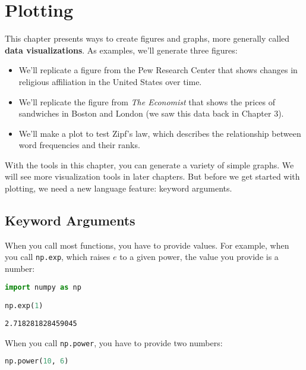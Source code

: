 \hypertarget{plotting}{%
\chapter{Plotting}\label{plotting}}

This chapter presents ways to create figures and graphs, more generally
called \textbf{data visualizations}. As examples, we'll generate three
figures:

\begin{itemize}
\item
  We'll replicate a figure from the Pew Research Center that shows
  changes in religious affiliation in the United States over time.
\item
  We'll replicate the figure from \emph{The Economist} that shows the
  prices of sandwiches in Boston and London (we saw this data back in
  Chapter 3).
\item
  We'll make a plot to test Zipf's law, which describes the relationship
  between word frequencies and their ranks.
\end{itemize}

With the tools in this chapter, you can generate a variety of simple
graphs. We will see more visualization tools in later chapters. But
before we get started with plotting, we need a new language feature:
keyword arguments.

\hypertarget{keyword-arguments}{%
\section{Keyword Arguments}\label{keyword-arguments}}

When you call most functions, you have to provide values. For example,
when you call \passthrough{\lstinline!np.exp!}, which raises \(e\) to a
given power, the value you provide is a number:

\begin{lstlisting}[language=Python,style=source]
import numpy as np

np.exp(1)
\end{lstlisting}

\begin{lstlisting}[style=output]
2.718281828459045
\end{lstlisting}

When you call \passthrough{\lstinline!np.power!}, you have to provide
two numbers:

\begin{lstlisting}[language=Python,style=source]
np.power(10, 6)
\end{lstlisting}

